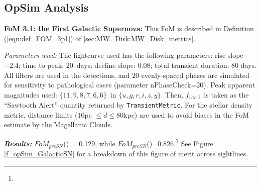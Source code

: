 

\subsection{OpSim Analysis}
\label{sec:\secname:MW_Disk_analysis}

{\bf FoM 3.1: the First Galactic Supernova:} This FoM is described in
Definition (\ref{eqn:def_FOM_3p1}) of
\autoref{sec:MW_Disk:MW_Disk_metrics}.

{\it Parameters used:} The lightcurve used has the following parameters:
rise slope $-2.4$; time to peak; $20$~days; decline slope: $0.08$; total
transient duration: 80 days. All filters are used in the detections, and
20 evenly-spaced phases are simulated for sensitivity to pathological
cases (parameter nPhaseCheck=20). Peak apparent magnitudes used: $\{
11,9,8,7,6,6\}$~in $\{u,g,r,i,z,y\}$. Then, $f_{var, i}$~is taken as the
``Sawtooth Alert'' quantity returned by {\tt TransientMetric}. For the
stellar density metric, distance limits ($10$pc $\le d \le 80$kpc) are
used to avoid biases in the FoM estimate by the Magellanic Clouds.

{\it \bf Results:} $FoM_{preSN}$() = 0.129,
while
$FoM_{preSN}$()=0.826.\footnote{} See Figure
\ref{f_opSim_GalacticSN} for a breakdown of this figure of merit across
sightlines.


